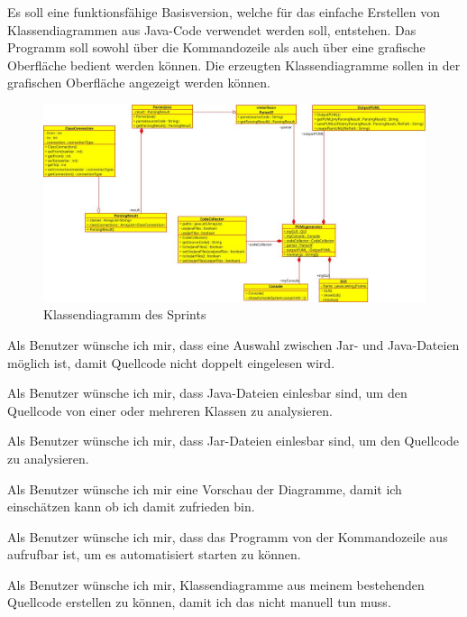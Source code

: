 
Es soll eine funktionsfähige Basisversion, welche für das einfache Erstellen von Klassendiagrammen aus Java-Code verwendet werden soll, entstehen. Das Programm soll sowohl über die Kommandozeile als auch über eine grafische Oberfläche bedient werden können. Die erzeugten Klassendiagramme sollen in der grafischen Oberfläche angezeigt werden können.

\begin{figure}[hbtp]
\centering
\includegraphics[scale=0.5]{Bilder/classDiagrammSprint1}
\caption{Klassendiagramm des Sprints}
\end{figure}
\nsecend

Als Benutzer wünsche ich mir, dass eine Auswahl zwischen Jar- und Java-Dateien möglich ist, damit Quellcode nicht doppelt eingelesen wird.
\nsecend

Als Benutzer wünsche ich mir, dass Java-Dateien einlesbar sind, um den Quellcode von einer oder mehreren Klassen zu analysieren.
\nsecend

Als Benutzer wünsche ich mir, dass Jar-Dateien einlesbar sind, um den Quellcode zu analysieren.
\nsecend
\nsecend

Als Benutzer wünsche ich mir eine Vorschau der Diagramme, damit ich einschätzen kann ob ich damit zufrieden bin.
\nsecend

Als Benutzer wünsche ich mir, dass das Programm von der Kommandozeile aus aufrufbar ist, um es automatisiert starten zu können.
\nsecend

Als Benutzer wünsche ich mir, Klassendiagramme aus meinem bestehenden Quellcode erstellen zu können, damit ich das nicht manuell tun muss.
\nsecend

